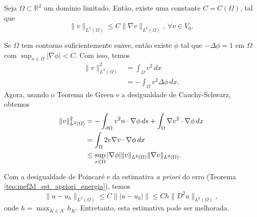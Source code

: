 \begin{teo}
  Seja $\Omega\subset \mathbb{R}^2$ um domínio limitado. Então, existe uma constante $C = C(\Omega)$, tal que
  \begin{equation}
    \|v\|_{L^2(\Omega)} \leq C\|\nabla v\|_{L^2(\Omega)},~\forall v\in V_0.
  \end{equation}
\end{teo}
\begin{dem}
  Se $\Omega$ tem contorno suficientemente suave, então existe $\phi$ tal que $-\Delta \phi = 1$ em $\Omega$ com $\sup_{x\in\Omega}|\nabla \phi| < C$. Com isso, temos
  \begin{align}
    \|v\|_{L^2(\Omega)}^2 &= \int_{\Omega} v^2\,dx\\
    &= -\int_{\Omega} v^2\Delta\phi\,dx.
  \end{align}
Agora, usando o Teorema de Green e a desigualdade de Cauchy-Schwarz, obtemos
\begin{align}
  \|v\|_{L^2(\Omega)}^2 &= -\int_{\partial\Omega} v^2n\cdot\nabla \phi\,ds + \int_\Omega \nabla v^2\cdot\nabla \phi\,dx\\
  &= \int_\Omega 2v\nabla v\cdot\nabla \phi\,dx\\
  &\leq \sup_{x\in\Omega} |\nabla \phi|\|v\|_{L^2(\Omega)}\|\nabla v\|_{L^2(\Omega)}.
\end{align}
\end{dem}

Com a desigualdade de Poincaré e da estimativa {\it a priori} do erro (Teorema \ref{teo:mef2d_est_apriori_energia}), temos
\begin{equation}\label{eq:mef2d_est_apriori}
  \|u-u_h\|_{L^2(\Omega)} \leq C \||u-u_h|\| \leq Ch\|D^2u\|_{L^2(\Omega)},
\end{equation}
onde $h = \max_{K\in\mathcal{K}} h_K$. Entretanto, esta estimativa pode ser melhorada.

